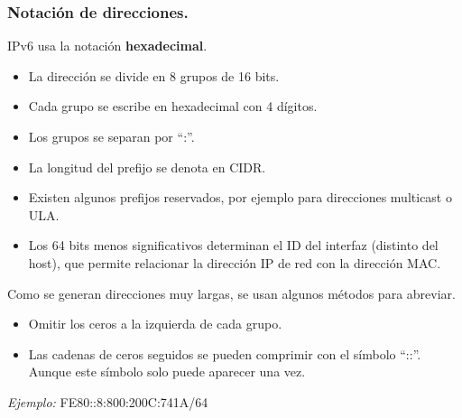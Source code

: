 \begin{onepage}
\subsubsection{Notación de direcciones.}
IPv6 usa la notación \textbf{hexadecimal}.
\begin{itemize}
    \item La dirección se divide en 8 grupos de 16 bits.
    \item Cada grupo se escribe en hexadecimal con 4 dígitos.
    \item Los grupos se separan por \enquote{:}.
    \item La longitud del prefijo se denota en CIDR.
    \item Existen algunos prefijos reservados, por ejemplo para direcciones multicast o ULA.
    \item Los 64 bits menos significativos determinan el ID del interfaz (distinto del host), que permite relacionar la dirección IP de red con la dirección MAC.
    \end{itemize}
    Como se generan direcciones muy largas, se usan algunos métodos para abreviar.
    \begin{itemize}
    \item Omitir los ceros a la izquierda de cada grupo.
    \item Las cadenas de ceros seguidos se pueden comprimir con el símbolo \enquote{::}. Aunque este símbolo solo puede aparecer una vez.
\end{itemize}
\begin{center}
    \textit{Ejemplo: }FE80::8:800:200C:741A/64
\end{center}
\end{onepage}
